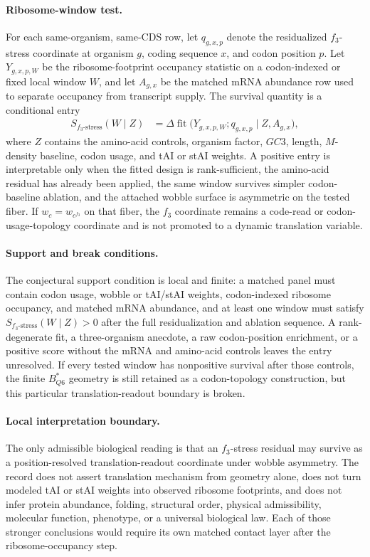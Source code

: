 \paragraph{Ribosome-window test.}
For each same-organism, same-CDS row, let $q_{g,x,p}$ denote the residualized $f_3$-stress coordinate at organism $g$, coding sequence $x$, and codon position $p$.  Let $Y_{g,x,p,W}$ be the ribosome-footprint occupancy statistic on a codon-indexed or fixed local window $W$, and let $A_{g,x}$ be the matched mRNA abundance row used to separate occupancy from transcript supply.  The survival quantity is a conditional entry
$$
\begin{aligned}
S_{f_3\text{-stress}}(W\mid Z)
  &= \Delta \operatorname{fit}\bigl(Y_{g,x,p,W};q_{g,x,p}\mid Z,A_{g,x}\bigr),
\end{aligned}
$$
where $Z$ contains the amino-acid controls, organism factor, $GC3$, length, $M$-density baseline, codon usage, and tAI or stAI weights.  A positive entry is interpretable only when the fitted design is rank-sufficient, the amino-acid residual has already been applied, the same window survives simpler codon-baseline ablation, and the attached wobble surface is asymmetric on the tested fiber.  If $w_c=w_{c^{f_3}}$ on that fiber, the $f_3$ coordinate remains a code-read or codon-usage-topology coordinate and is not promoted to a dynamic translation variable.

\paragraph{Support and break conditions.}
The conjectural support condition is local and finite: a matched panel must contain codon usage, wobble or tAI/stAI weights, codon-indexed ribosome occupancy, and matched mRNA abundance, and at least one window must satisfy $S_{f_3\text{-stress}}(W\mid Z)>0$ after the full residualization and ablation sequence.  A rank-degenerate fit, a three-organism anecdote, a raw codon-position enrichment, or a positive score without the mRNA and amino-acid controls leaves the entry unresolved.  If every tested window has nonpositive survival after those controls, the finite $B^*_{Q6}$ geometry is still retained as a codon-topology construction, but this particular translation-readout boundary is broken.

\paragraph{Local interpretation boundary.}
The only admissible biological reading is that an $f_3$-stress residual may survive as a position-resolved translation-readout coordinate under wobble asymmetry.  The record does not assert translation mechanism from geometry alone, does not turn modeled tAI or stAI weights into observed ribosome footprints, and does not infer protein abundance, folding, structural order, physical admissibility, molecular function, phenotype, or a universal biological law.  Each of those stronger conclusions would require its own matched contact layer after the ribosome-occupancy step.

